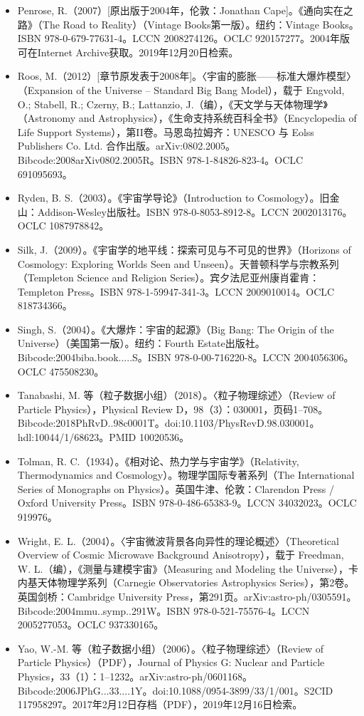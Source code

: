 \begin{itemize}
\item Penrose, R.（2007）[原出版于2004年，伦敦：Jonathan Cape]。《通向实在之路》（The Road to Reality）（Vintage Books第一版）。纽约：Vintage Books。ISBN 978-0-679-77631-4。LCCN 2008274126。OCLC 920157277。2004年版可在Internet Archive获取。2019年12月20日检索。 
\item Roos, M.（2012）[章节原发表于2008年]。〈宇宙的膨胀——标准大爆炸模型〉（Expansion of the Universe – Standard Big Bang Model），载于 Engvold, O.; Stabell, R.; Czerny, B.; Lattanzio, J.（编），《天文学与天体物理学》（Astronomy and Astrophysics），《生命支持系统百科全书》（Encyclopedia of Life Support Systems），第II卷。马恩岛拉姆齐：UNESCO 与 Eolss Publishers Co. Ltd. 合作出版。arXiv:0802.2005。Bibcode:2008arXiv0802.2005R。ISBN 978-1-84826-823-4。OCLC 691095693。  
\item Ryden, B. S.（2003）。《宇宙学导论》（Introduction to Cosmology）。旧金山：Addison-Wesley出版社。ISBN 978-0-8053-8912-8。LCCN 2002013176。OCLC 1087978842。  
\item Silk, J.（2009）。《宇宙学的地平线：探索可见与不可见的世界》（Horizons of Cosmology: Exploring Worlds Seen and Unseen）。天普顿科学与宗教系列（Templeton Science and Religion Series）。宾夕法尼亚州康肖霍肯：Templeton Press。ISBN 978-1-59947-341-3。LCCN 2009010014。OCLC 818734366。  
\item Singh, S.（2004）。《大爆炸：宇宙的起源》（Big Bang: The Origin of the Universe）（美国第一版）。纽约：Fourth Estate出版社。Bibcode:2004biba.book.....S。ISBN 978-0-00-716220-8。LCCN 2004056306。OCLC 475508230。  
\item Tanabashi, M. 等（粒子数据小组）（2018）。〈粒子物理综述〉（Review of Particle Physics），Physical Review D，98（3）：030001，页码1–708。Bibcode:2018PhRvD..98c0001T。doi:10.1103/PhysRevD.98.030001。hdl:10044/1/68623。PMID 10020536。  
\item Tolman, R. C.（1934）。《相对论、热力学与宇宙学》（Relativity, Thermodynamics and Cosmology）。物理学国际专著系列（The International Series of Monographs on Physics）。英国牛津、伦敦：Clarendon Press / Oxford University Press。ISBN 978-0-486-65383-9。LCCN 34032023。OCLC 919976。  
\item Wright, E. L.（2004）。〈宇宙微波背景各向异性的理论概述〉（Theoretical Overview of Cosmic Microwave Background Anisotropy），载于 Freedman, W. L.（编），《测量与建模宇宙》（Measuring and Modeling the Universe），卡内基天体物理学系列（Carnegie Observatories Astrophysics Series），第2卷。英国剑桥：Cambridge University Press，第291页。arXiv:astro-ph/0305591。Bibcode:2004mmu..symp..291W。ISBN 978-0-521-75576-4。LCCN 2005277053。OCLC 937330165。  
\item Yao, W.-M. 等（粒子数据小组）（2006）。〈粒子物理综述〉（Review of Particle Physics）（PDF），Journal of Physics G: Nuclear and Particle Physics，33（1）：1–1232。arXiv:astro-ph/0601168。Bibcode:2006JPhG...33....1Y。doi:10.1088/0954-3899/33/1/001。S2CID 117958297。2017年2月12日存档（PDF），2019年12月16日检索。  
\end{itemize}







